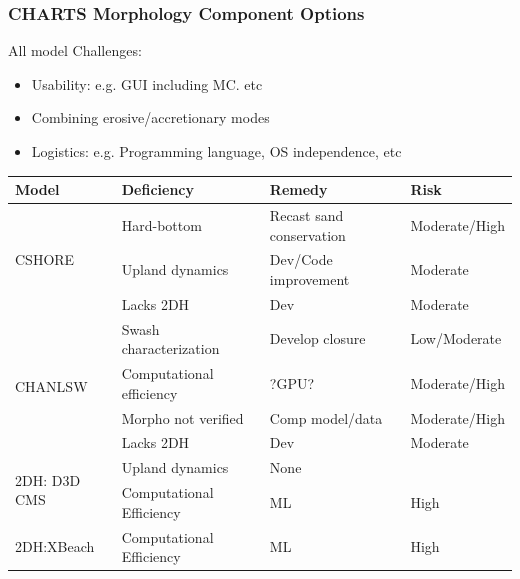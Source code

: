 \documentclass[aspectratio=169]{beamer}
\begin{document}
\begin{frame}
  \frametitle{CHARTS Morphology Component Options }
  \small
  All model Challenges:
  \begin{itemize}
  \item Usability: e.g. GUI including MC. etc 
  \item Combining erosive/accretionary modes
    \item Logistics: e.g. Programming language, OS independence, etc  
  \end{itemize}

      
\begin{table}[h]
  \begin{center}
    \begin{tabular}{l|l|l|l}
     \textbf{Model} & \textbf{Deficiency} & \textbf{Remedy} & \textbf{Risk}\\
      \hline
      \multirow{3}{*}{CSHORE} & Hard-bottom & Recast sand conservation& Moderate/High\\ %
      & Upland dynamics&Dev/Code improvement& Moderate\\ %
      & Lacks 2DH &Dev& Moderate\\ %
      \hline
      \multirow{4}{*}{CHANLSW}& Swash characterization & Develop closure& Low/Moderate\\ %
      & Computational efficiency& ?GPU?& Moderate/High\\ %
      & Morpho not verified& Comp model/data & Moderate/High\\ %
      & Lacks 2DH &Dev& Moderate\\ %
      \hline
      \multirow{2}{*}{2DH: D3D CMS}   & Upland dynamics & None&\\ %
                              & Computational Efficiency& ML& High\\ %
      \hline
      \multirow{1}{*}{2DH:XBeach} & Computational Efficiency& ML& High\\ %
      \hline
    \end{tabular}
  \end{center}
\end{table}

\end{frame}
  
\end{document}
